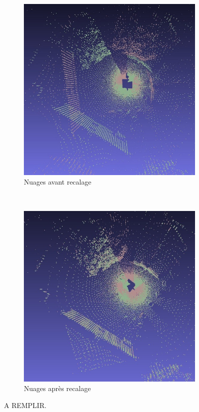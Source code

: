 \begin{figure}[!h]
   \centering
   \begin{subfigure}[t]{.5\linewidth}
     \centering
     \includegraphics[scale=0.5]{Images/Resultats/hannover_meshlab_before_transformation.jpg}
     \caption{Nuages avant recalage}
   \end{subfigure}%
   ~
   \begin{subfigure}[t]{.5\linewidth}
     \centering
     \includegraphics[scale=0.5]{Images/Resultats/hannover_meshlab_after_transformation.jpg}
     \caption{Nuages après recalage}
   \end{subfigure}
   
   \caption{A REMPLIR.}
   \label{fig:meshlab}
\end{figure}

